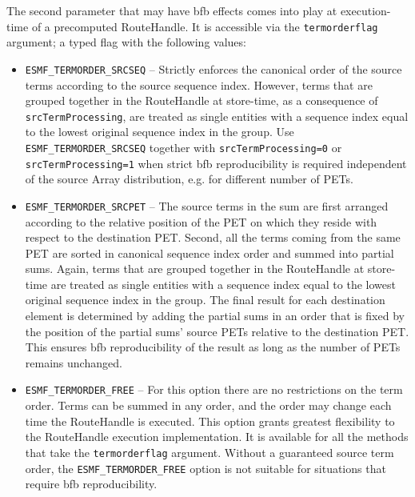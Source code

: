    The second parameter that may have bfb effects comes into play at 
   execution-time of a precomputed 
   RouteHandle. It is accessible via the {\tt termorderflag} argument; a typed 
   flag with the following values:
   \begin{itemize}
     \item {\tt ESMF\_TERMORDER\_SRCSEQ} -- Strictly enforces the canonical order
        of the source terms according to the source sequence index. However, 
        terms that are grouped together in the RouteHandle at store-time, as a 
        consequence of {\tt srcTermProcessing}, are treated as
        single entities with a sequence index equal to the lowest original
        sequence index in the group. Use {\tt ESMF\_TERMORDER\_SRCSEQ} together
        with {\tt srcTermProcessing=0} or {\tt srcTermProcessing=1} when strict
        bfb reproducibility is required independent of the source Array 
        distribution, e.g. for different number of PETs.
     \item {\tt ESMF\_TERMORDER\_SRCPET} -- The source terms in the sum are 
        first arranged according to the relative position of the PET on which 
        they reside with respect to the destination PET. Second, all the terms
        coming from the same PET are sorted in canonical sequence index order
        and summed into partial sums. Again, terms that are grouped together
        in the RouteHandle at store-time are treated as
        single entities with a sequence index equal to the lowest original
        sequence index in the group. The final result for each destination
        element is determined by adding the partial sums in an order that is 
        fixed by the position of the partial sums' source PETs relative to
        the destination PET. This ensures bfb reproducibility of the result as
        long as the number of PETs remains unchanged.
     \item {\tt ESMF\_TERMORDER\_FREE} -- For this option there are no
        restrictions on the term
        order. Terms can be summed in any order, and the order may change each
        time the RouteHandle is executed. This option grants greatest flexibility
        to the RouteHandle execution implementation. It is available for all the
        methods that take the {\tt termorderflag} argument. Without a
        guaranteed source term order, the {\tt ESMF\_TERMORDER\_FREE} option is
        not suitable for situations that require bfb reproducibility. 
   \end{itemize} 


